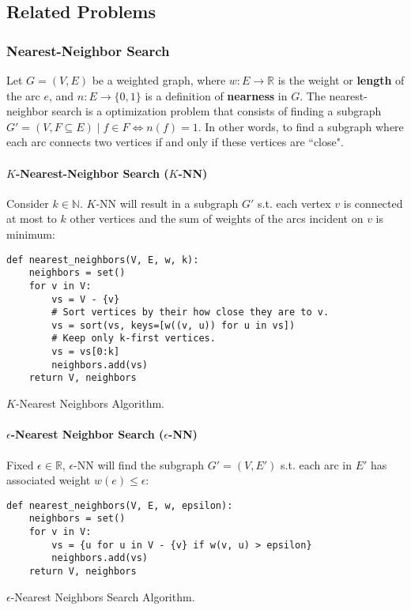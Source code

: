 \clearpage
\subsection{Related Problems}

\subsubsection{Nearest-Neighbor Search}

Let $G = (V, E)$ be a weighted graph, where $w \colon E \to \mathbb{R}$ is the weight or \textbf{length} of the arc $e$, and $n\colon E \to \{0, 1\}$ is a definition of \textbf{nearness} in $G$. The nearest-neighbor search is a optimization problem that consists of finding a subgraph $G' = (V, F \subseteq E) \mid f \in F \iff n(f) = 1$. In other words, to find a subgraph where each arc connects two vertices if and only if these vertices are ``close".

\paragraph{$K$-Nearest-Neighbor Search ($K$-NN)}
Consider $k \in \mathbb{N}$. $K$-NN will result in a subgraph $G'$ s.t. each vertex $v$ is connected at most to $k$ other vertices and the sum of weights of the arcs incident on $v$ is minimum:

\begin{listing}[H]
\begin{verbatim}
def nearest_neighbors(V, E, w, k):
    neighbors = set()
    for v in V:
        vs = V - {v}
        # Sort vertices by their how close they are to v.
        vs = sort(vs, keys=[w((v, u)) for u in vs])
        # Keep only k-first vertices.
        vs = vs[0:k]
        neighbors.add(vs)
    return V, neighbors
\end{verbatim}
\caption{$K$-Nearest Neighbors Algorithm.}
\end{listing}

\paragraph{$\epsilon$-Nearest Neighbor Search ($\epsilon$-NN)}
	Fixed $\epsilon \in\mathbb{R}$, $\epsilon$-NN will find the subgraph $G'=(V, E')$ s.t. each arc in $E'$ has associated weight $w(e) \leq \epsilon$:
	
\begin{listing}[H]
\begin{verbatim}
def nearest_neighbors(V, E, w, epsilon):
    neighbors = set()
    for v in V:
        vs = {u for u in V - {v} if w(v, u) > epsilon}
        neighbors.add(vs)
    return V, neighbors
\end{verbatim}
\caption{$\epsilon$-Nearest Neighbors Search Algorithm.}
\end{listing}

